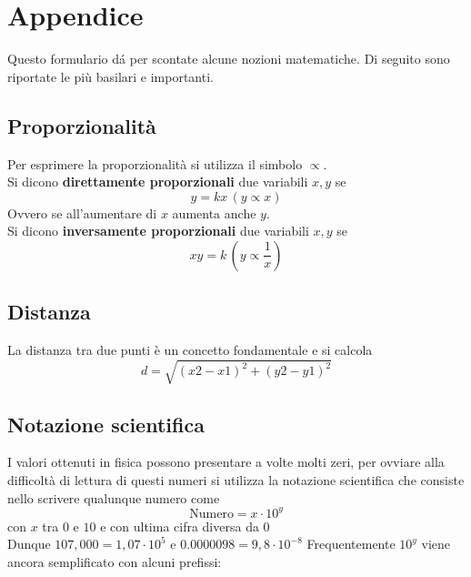 
\section{Appendice}
Questo formulario dá per scontate alcune nozioni matematiche. Di seguito sono riportate le più
basilari e importanti.

\subsection{Proporzionalità}
Per esprimere la proporzionalità si utilizza il simbolo $\propto$.\\
Si dicono \textbf{direttamente proporzionali} due variabili $x,y$ se
\begin{equation*}
y = kx\,(y\propto x)
\end{equation*}
Ovvero se all'aumentare di $x$ aumenta anche $y$.\\ [\baselineskip]
Si dicono \textbf{inversamente proporzionali} due variabili $x,y$ se 
\begin{equation*}
xy = k\,\left(y\propto\frac{1}{x}\right)
\end{equation*}
  
\subsection{Distanza}

La distanza tra due punti è un concetto fondamentale e si calcola 
\begin{equation*}
d=\sqrt{(x2-x1)^{2}+(y2-y1)^{2}}
\end{equation*}
\begin{center}     
\end{center}

\subsection{Notazione scientifica}
I valori ottenuti in fisica possono presentare a volte molti zeri, per ovviare alla difficoltà di 
lettura di questi numeri si utilizza la notazione scientifica che consiste nello scrivere qualunque
numero come 
\begin{equation*}
\text{Numero}=x\cdot 10^{y}
\end{equation*}
con $x$ tra $0$ e $10$ e con ultima cifra diversa da $0$\\
Dunque $107,000=1,07\cdot10^{5}$ e $0.0000098=9,8\cdot10^{-8}$ 
Frequentemente $10^{y}$ viene ancora semplificato con alcuni prefissi:

